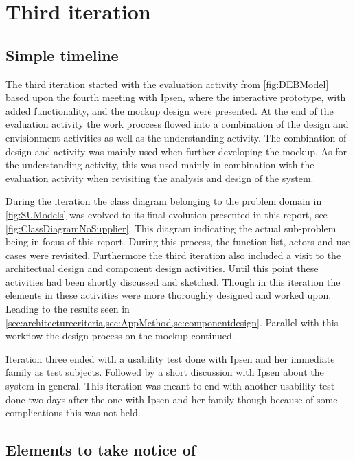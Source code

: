 \section{Third iteration}
\subsection{Simple timeline}\label{sec:3Iteration-timeline}
The third iteration started with the evaluation activity from \cref{fig:DEBModel} based upon the fourth meeting with Ipsen, where the interactive prototype, with added functionality, and the mockup design were presented.
At the end of the evaluation activity the work proccess flowed into a combination of the design and envisionment activities as well as the understanding activity.
The combination of design and activity was mainly used when further developing the mockup.
As for the understanding activity, this was used mainly in combination with the evaluation activity when revisiting the analysis and design of the system.

During the iteration the class diagram belonging to the problem domain in \cref{fig:SUModels} was evolved to its final evolution presented in this report, see \cref{fig:ClassDiagramNoSupplier}.
This diagram indicating the actual sub-problem being in focus of this report.
During this process, the function list, actors and use cases were revisited.
Furthermore the third iteration also included a visit to the architectual design and component design activities.
Until this point these activities had been shortly discussed and sketched.
Though in this iteration the elements in these activities were more thoroughly designed and worked upon.
Leading to the results seen in \cref{sec:architecturecriteria,sec:AppMethod,sc:componentdesign}.
Parallel with this workflow the design process on the mockup continued.

Iteration three ended with a usability test done with Ipsen and her immediate family as test subjects.
Followed by a short discussion with Ipsen about the system in general.
This iteration was meant to end with another usability test done two days after the one with Ipsen and her family though because of some complications this was not held.

\subsection{Elements to take notice of}
